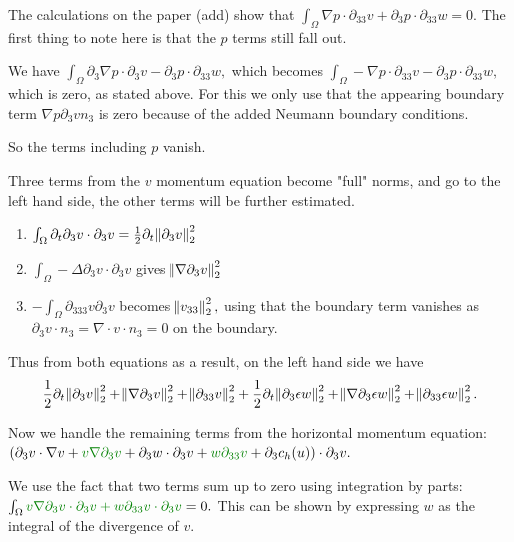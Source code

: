 \documentclass[11pt]{article}
\begin{document}
The calculations on the paper (add) show that $\int_\Omega \nabla p \cdot \partial_{33}v + \partial_3 p \cdot \partial_{33} w = 0.$ The first thing to note here is that the $p$ terms still fall out.

We have $\int_\Omega \partial_3 \nabla p \cdot \partial_3 v - \partial_3 p \cdot \partial_{33} w,$ which becomes $\int_\Omega - \nabla p \cdot \partial_{33} v - \partial_3 p \cdot \partial_{33} w,$ which is zero, as stated above. For this we only use that the appearing boundary term $\nabla p \partial_3 v n_3$ is zero because of the added Neumann boundary conditions.

So the terms including $p$ vanish.

Three terms from the $v$ momentum equation become "full" norms, and go to the left hand side, the other terms will be further estimated.

\begin{enumerate}

\item $\int_\Omega \partial_t \partial_3 v \cdot \partial_3 v = \frac{1}{2} \partial_t \norm{\partial_3 v}_2^2$

\item $\int_\Omega - \Delta \partial_3 v \cdot \partial_3 v$ gives $\norm{\nabla \partial_3 v}_2^2$

\item $- \int_\Omega \partial_{333} v \partial_3 v$ becomes $\norm{v_{33}}_2^2,$ using that the boundary term vanishes as $\partial_3 v \cdot n_3 = \nabla \cdot v \cdot n_3 = 0$ on the boundary.

\end{enumerate}

Thus from both equations as a result, on the left hand side we have $$ \frac{1}{2} \partial_t \norm{\partial_3 v}_2^2 + \norm{\nabla \partial_3 v}_2^2 + \norm{\partial_{33} v}_2^2 +  \frac{1}{2} \partial_t \norm{\partial_3 \epsilon w}_2^2 + \norm{\nabla \partial_3 \epsilon w}_2^2 + \norm{\partial_{33} \epsilon w}_2^2.$$

Now we handle the remaining terms from the horizontal momentum equation: $( \partial_3 v \cdot \nabla v + \textcolor{ao}{v \nabla \partial_3 v} + \partial_3 w \cdot \partial_3 v + \textcolor{ao}{w \partial_{33}v} + \partial_3 c_h (u)) \cdot \partial_3 v.$

We use the fact that two terms sum up to zero using integration by parts: $\int_\Omega \textcolor{ao}{v \nabla \partial_3 v \cdot \partial_3 v + w \partial_{33}v \cdot \partial_3 v} = 0.$ This can be shown by expressing $w$ as the integral of the divergence of $v.$
\end{document}
